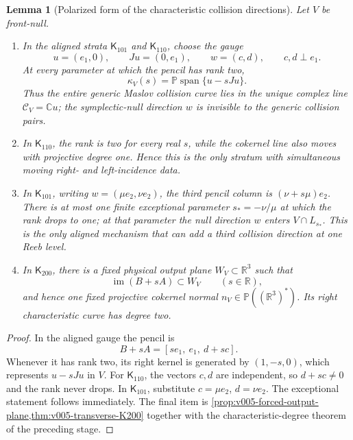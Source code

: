 \documentclass[10pt]{article}
\newtheorem{lemma}[theorem]{Lemma}
\newcommand{\R}{\mathbb R}
\begin{document}
\begin{lemma}[Polarized form of the characteristic collision directions]
\label{lem:v046-polarized-characteristics}
Let \(V\) be front-null.
\begin{enumerate}[label=\textnormal{(\roman*)}]
\item In the aligned strata \(\mathsf K_{101}\) and \(\mathsf K_{110}\), choose the gauge
\[
u=(e_1,0),
\qquad
Ju=(0,e_1),
\qquad
w=(c,d),
\qquad
c,d\perp e_1.
\]
At every parameter at which the pencil has rank two,
\[
\boxed{
\kappa_V(s)
=
\mathbb P\operatorname{span}\{u-sJu\}.
}
\]
Thus the entire generic Maslov collision curve lies in the unique complex line
\(\mathcal C_V=\mathbb Cu\); the symplectic-null direction \(w\) is invisible to the generic
collision pairs.

\item In \(\mathsf K_{110}\), the rank is two for every real \(s\), while the cokernel line also
moves with projective degree one.  Hence this is the only stratum with simultaneous moving
right- and left-incidence data.

\item In \(\mathsf K_{101}\), writing
\(w=(\mu e_2,\nu e_2)\), the third pencil column is
\((\nu+s\mu)e_2\).  There is at most one finite exceptional parameter
\(s_*=-\nu/\mu\) at which the rank drops to one; at that parameter the null direction \(w\) enters
\(V\cap L_{s_*}\).  This is the only aligned mechanism that can add a third collision direction at
one Reeb level.

\item In \(\mathsf K_{200}\), there is a fixed physical output plane \(W_V\subset\R^3\) such that
\[
\boxed{
\operatorname{im}(B+sA)\subset W_V
\qquad(s\in\R),
}
\]
and hence one fixed projective cokernel normal
\(n_V\in\mathbb P((\R^3)^*)\).  Its right characteristic curve has degree two.
\end{enumerate}
\end{lemma}

\begin{proof}
In the aligned gauge the pencil is
\[
B+sA=[s e_1,\ e_1,\ d+s c].
\]
Whenever it has rank two, its right kernel is generated by \((1,-s,0)\), which represents
\(u-sJu\) in \(V\).  For \(\mathsf K_{110}\), the vectors \(c,d\) are independent, so
\(d+sc\ne0\) and the rank never drops.  In \(\mathsf K_{101}\), substitute
\(c=\mu e_2\), \(d=\nu e_2\).  The exceptional statement follows immediately.  The final item is
\cref{prop:v005-forced-output-plane,thm:v005-transverse-K200} together with the characteristic-degree
theorem of the preceding stage.
\end{proof}
\end{document}
